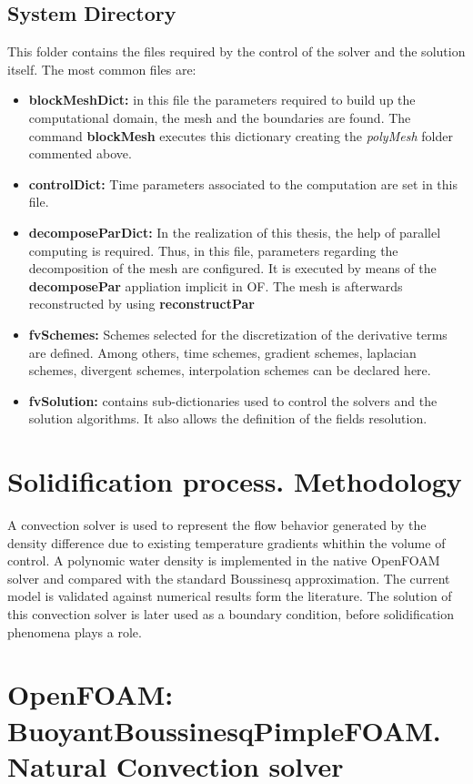 \subsection{System Directory}
This folder contains the files required by the control of the solver and the solution itself. The most common files are:
\begin{itemize}
	\item \textbf{blockMeshDict:} in this file the parameters required to build up the computational domain, the mesh and the boundaries are found. The command \textbf{blockMesh} executes this dictionary creating the \textit{polyMesh} folder commented above.
	\item \textbf{controlDict:} Time parameters associated to the computation are set in this file. 
	\item \textbf{decomposeParDict:} In the realization of this thesis, the help of parallel computing is required. Thus, in this file, parameters regarding the decomposition of the mesh are configured. It is executed by means of the \textbf{decomposePar} appliation implicit in OF. The mesh is afterwards reconstructed by using \textbf{reconstructPar} 
	\item \textbf{fvSchemes:} Schemes selected for the discretization of the derivative terms are defined. Among others, time schemes, gradient schemes, laplacian schemes, divergent schemes, interpolation schemes can be declared here.
	\item \textbf{fvSolution:} contains sub-dictionaries used to control the solvers and the solution algorithms. It also allows the definition of the fields resolution.
\end{itemize}


\section{Solidification process. Methodology}
A convection solver is used to represent the flow behavior generated by the density difference due to existing temperature gradients whithin the volume of control. A polynomic water density is implemented in the native OpenFOAM solver and compared with the standard Boussinesq approximation. The current model is validated against numerical results form the literature. The solution of this convection solver is later used as a boundary condition, before solidification phenomena plays a role.

\newpage
\section{OpenFOAM: BuoyantBoussinesqPimpleFOAM. Natural Convection solver}

